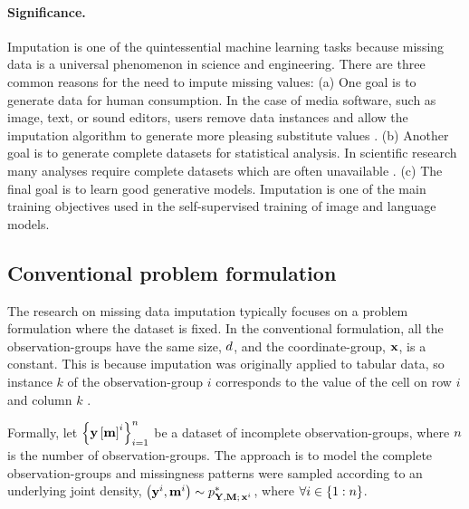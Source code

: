 \documentclass[../thesis.tex]{subfiles}
\begin{document}
\paragraph{Significance.} Imputation is one of the quintessential machine learning tasks because missing data is a universal phenomenon in science and engineering. There are three common reasons for the need to impute missing values: (a) One goal is to generate data for human consumption. In the case of media software, such as image, text, or sound editors, users remove data instances and allow the imputation algorithm to generate more pleasing substitute values \citep{quanDeepLearningBasedImage2024}. (b) Another goal is to generate complete datasets for statistical analysis. In scientific research many analyses require complete datasets which are often unavailable \citep{sterneMultipleImputationMissing2009}. (c) The final goal is to learn good generative models. Imputation is one of the main training objectives used in the self-supervised training of image \citep{heMaskedAutoencodersAre2022} and language \citep{devlinBERTPretrainingDeep2019} models. 

\subsection{Conventional problem formulation}

The research on missing data imputation typically focuses on a problem formulation where the dataset is fixed. 
In the conventional formulation, all the observation-groups have the same size, $d$, and the coordinate-group, $\mathbf{{x}}$, is a constant. This is because imputation was originally applied to tabular data, so instance $k$ of the observation-group $i$ corresponds to the value of the cell on row $i$ and column $k$ \citep{rubinInferenceMissingData1976}.

Formally, let $\left\{ \mathbf{{y}} \left[ \mathbf{{m}} \right]^i \right\}_{i=1}^{n}$ be a dataset of incomplete observation-groups, where $n$ is the number of observation-groups. The approach is to model the complete observation-groups and missingness patterns were sampled according to an underlying joint density, $\left( \mygroup{\myvect{y}}^i, \mygroup{\myvect{m}}^i \right) \sim \myfunc{p}^{*}_{\mygroup{\myrv{y}}, \mygroup{\myrv{m}}; \, \mygroup{x}^i}$, where $\forall i \in \{1:n\}$. 
\end{document}
